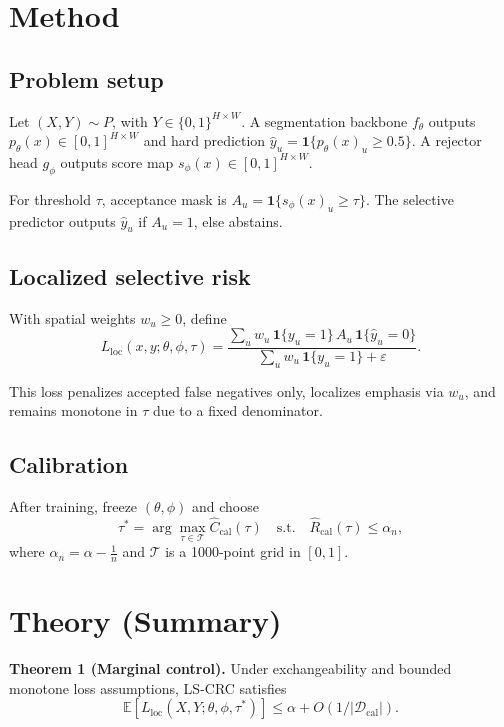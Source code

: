 \documentclass{article}
\begin{document}
\section{Method}
\subsection{Problem setup}
Let $(X,Y)\sim P$, with $Y\in\{0,1\}^{H\times W}$. A segmentation backbone $f_\theta$ outputs $p_\theta(x)\in[0,1]^{H\times W}$ and hard prediction $\hat y_u=\mathbf{1}\{p_\theta(x)_u\ge 0.5\}$. A rejector head $g_\phi$ outputs score map $s_\phi(x)\in[0,1]^{H\times W}$.

For threshold $\tau$, acceptance mask is $A_u=\mathbf{1}\{s_\phi(x)_u\ge\tau\}$. The selective predictor outputs $\hat y_u$ if $A_u=1$, else abstains.

\subsection{Localized selective risk}
With spatial weights $w_u\ge 0$, define
\begin{equation}
L_{\mathrm{loc}}(x,y;\theta,\phi,\tau)=
\frac{\sum_u w_u\,\mathbf{1}\{y_u=1\}\,A_u\,\mathbf{1}\{\hat y_u=0\}}
{\sum_u w_u\,\mathbf{1}\{y_u=1\}+\varepsilon}.
\end{equation}

This loss penalizes accepted false negatives only, localizes emphasis via $w_u$, and remains monotone in $\tau$ due to a fixed denominator.

\subsection{Calibration}
After training, freeze $(\theta,\phi)$ and choose
\begin{equation}
\tau^*=\arg\max_{\tau\in\mathcal T}\widehat C_{\mathrm{cal}}(\tau)
\quad\text{s.t.}\quad
\widehat R_{\mathrm{cal}}(\tau)\le \alpha_n,
\end{equation}
where $\alpha_n=\alpha-\frac{1}{n}$ and $\mathcal T$ is a 1000-point grid in $[0,1]$.

\section{Theory (Summary)}
\textbf{Theorem 1 (Marginal control).}
Under exchangeability and bounded monotone loss assumptions, LS-CRC satisfies
\[
\mathbb E\!\left[L_{\mathrm{loc}}(X,Y;\theta,\phi,\tau^*)\right]\le \alpha + O(1/|\mathcal D_{\mathrm{cal}}|).
\]
\end{document}
